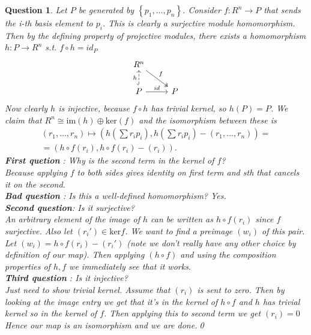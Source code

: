 \documentclass[a4paper]{article}
\newtheorem{que}[thm]{Question}
\begin{document}
\begin{que}
    Let  $P$ be generated by  $\left\{ p_1, \ldots, p_n \right\} $. Consider $f:R^{n}\to P$ that sends the i-th basis element to $p_i$. This is clearly a surjective module homomorphism. Then by the defining property of projective modules, there exists a homomorphism  $h:P\to R^{n}$ s.t. $f\circ h=id_P$
    \[
    \begin{tikzcd}
        R^{n}\arrow[rd,two heads,"f"]\\
        P\arrow[r,"id"]\arrow[u,dashed,hook,"h"] & P
    \end{tikzcd}
   \] 
   Now clearly $h$ is injective, because $f\circ h$ has trivial kernel, so  $h(P)=P$. We claim that  $R^{n}\cong \text{im}\left( h \right) \oplus \text{ker}\left( f \right) $ and the isomorphism between these is \begin{align*}
       \left( r_1, \ldots, r_n \right)\mapsto \left( h\left( \sum r_i p_i \right),h\left( \sum r_i p_i \right)- \left( r_1, \ldots, r_n \right)  \right)=\\ =\left( h\circ f\left( r_i\right), h\circ f\left( r_i \right)-\left( r_i \right)    \right) 
   .
   \end{align*}
   \textbf{First quetion} : Why is the second term in the kernel of $f$? \\Because applying $f$ to both sides gives identity on first term and sth that cancels it on the second.\\
   \textbf{Bad question} : Is this a well-defined homomorphism? Yes.\\
   \textbf{Second question}: Is it surjective? \\
   An arbitrary element of the image of $h$ can be written as $h\circ f(r_i)$ since $f$ surjective. Also let $\left( r_i' \right) \in \text{ker}f$. We want to find a preimage $\left( w_i \right) $ of this pair. Let $\left( w_i \right) =h\circ f(r_i)-\left( r_i' \right) $ (note we don't really have any other choice by definition of our map). Then applying $\left( h\circ f \right) $ and using the composition properties of $h,f$ we immediately see that it works.\\
   \textbf{Third question} : Is it injective?\\
Just need to show trivial kernel. Assume that $\left( r_i \right) $ is sent to zero. Then by looking at the image entry we get that it's in the kernel of  $h\circ f$ and  $h$ has trivial kernel so in the kernel of $f$. Then applying this to second term we get  $\left( r_i \right)  =0$ \\ Hence our map is an isomorphism and we are done.\qed \\

\end{que}
\end{document}
